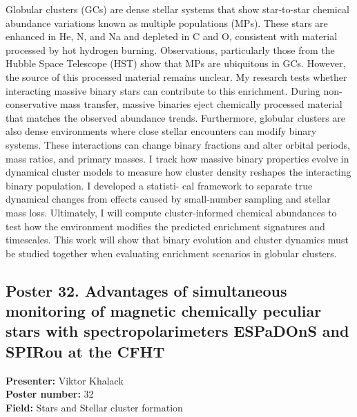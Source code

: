 Globular clusters (GCs) are dense stellar systems that show star-to-star chemical abundance variations known as multiple populations (MPs). These stars are enhanced in He, N, and Na and depleted in C and O, consistent with material processed by hot hydrogen burning. Observations, particularly those from the Hubble Space Telescope (HST) show that MPs are ubiquitous in GCs. However, the source of this processed material remains unclear. My research tests whether interacting massive binary stars can contribute to this enrichment. During non-conservative mass transfer, massive binaries eject chemically processed material that matches the observed abundance trends. Furthermore, globular clusters are also dense environments where close stellar encounters can modify binary systems. These interactions can change binary fractions and alter orbital periods, mass ratios, and primary masses. I track how massive binary properties evolve in dynamical cluster models to measure how cluster density reshapes the interacting binary population. I developed a statisti- cal framework to separate true dynamical changes from effects caused by small-number sampling and stellar mass loss. Ultimately, I will compute cluster-informed chemical abundances to test how the environment modifies the predicted enrichment signatures and timescales. This work will show that binary evolution and cluster dynamics must be studied together when evaluating enrichment scenarios in globular clusters.

\hypertarget{poster-abstract-talk-81}{}\label{poster-abstract-page-talk-81}
\subsection*{Poster 32. Advantages of simultaneous monitoring of magnetic chemically peculiar stars with spectropolarimeters ESPaDOnS and SPIRou at the CFHT}
\textbf{Presenter:} Viktor Khalack\\
\textbf{Poster number:} 32\\
\textbf{Field:} Stars and Stellar cluster formation

